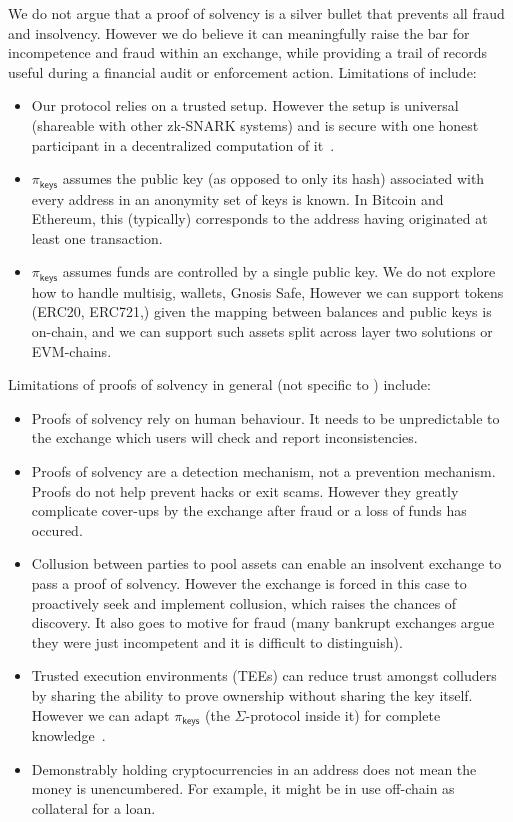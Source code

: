 We do not argue that a proof of solvency is a silver bullet that prevents all fraud and insolvency. However we do believe it can meaningfully raise the bar for incompetence and fraud within an exchange, while providing a trail of records useful during a financial audit or enforcement action. Limitations of \Sys include: 

\begin{itemize}
\item Our protocol relies on a trusted setup. However the setup is universal (shareable with other zk-SNARK systems) and is secure with one honest participant in a decentralized computation of it~\cite{tau}.
\item $\pi_\mathsf{keys}$ assumes the public key (as opposed to only its hash) associated with every address in an anonymity set of keys is known. In Bitcoin and Ethereum, this (typically) corresponds to the address having originated at least one transaction. 
\item $\pi_\mathsf{keys}$ assumes funds are controlled by a single public key. We do not explore how to handle multisig, wallets, Gnosis Safe, \etc However we can support tokens (\eg ERC20, ERC721,\etc) given the mapping between balances and public keys is on-chain, and we can support such assets split across layer two solutions or EVM-chains. 
\end{itemize}

Limitations of proofs of solvency in general (not specific to \Sys) include:

\begin{itemize}
\item Proofs of solvency rely on human behaviour. It needs to be unpredictable to the exchange which users will check and report inconsistencies.
\item Proofs of solvency are a detection mechanism, not a prevention mechanism. Proofs do not help prevent hacks or exit scams. However they greatly complicate cover-ups by the exchange after fraud or a loss of funds has occured.
\item Collusion between parties to pool assets can enable an insolvent exchange to pass a proof of solvency. However the exchange is forced in this case to proactively seek and implement collusion, which raises the chances of discovery. It also goes to motive for fraud (many bankrupt exchanges argue they were just incompetent and it is difficult to distinguish). 
\item Trusted execution environments (TEEs) can reduce trust amongst colluders by sharing the ability to prove ownership without sharing the key itself. However we can adapt $\pi_\mathsf{keys}$ (the $\Sigma$-protocol inside it) for complete knowledge~\cite{completeknowledge}.
\item Demonstrably holding cryptocurrencies in an address does not mean the money is unencumbered. For example, it might be in use off-chain as collateral for a loan. 
\end{itemize}


